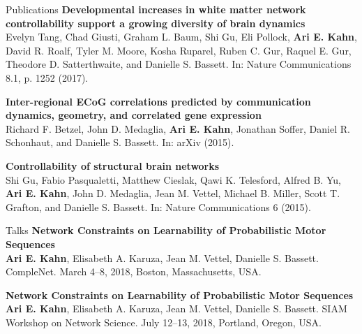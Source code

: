 \documentclass{resume} %
\begin{document}
\begin{rSection}{Publications}
\textbf{Developmental increases in white matter network controllability support a growing diversity of brain dynamics} \\
Evelyn Tang, Chad Giusti, Graham L. Baum, Shi Gu, Eli Pollock, \textbf{Ari E. Kahn}, David R. Roalf, Tyler M. Moore, Kosha Ruparel, Ruben C. Gur, Raquel E. Gur, Theodore D. Satterthwaite, and Danielle S. Bassett. In: Nature Communications 8.1, p. 1252 (2017).



\textbf{Inter-regional ECoG correlations predicted by communication dynamics, geometry, and correlated gene expression} \\
Richard F. Betzel, John D. Medaglia, \textbf{Ari E. Kahn}, Jonathan Soffer, Daniel R. Schonhaut, and Danielle S. Bassett. In: arXiv (2015).

\textbf{Controllability of structural brain networks} \\
Shi Gu, Fabio Pasqualetti, Matthew Cieslak, Qawi K. Telesford, Alfred B. Yu, \textbf{Ari E. Kahn}, John D. Medaglia, Jean M. Vettel, Michael B. Miller, Scott T. Grafton, and Danielle S. Bassett. In: Nature Communications 6 (2015).

\end{rSection}


\begin{rSection}{Talks}
\textbf{Network Constraints on Learnability of Probabilistic Motor Sequences} \\
\textbf{Ari E. Kahn}, Elisabeth A. Karuza, Jean M. Vettel, Danielle S. Bassett. CompleNet. March 4--8, 2018, Boston, Massachusetts, USA.

\textbf{Network Constraints on Learnability of Probabilistic Motor Sequences} \\
\textbf{Ari E. Kahn}, Elisabeth A. Karuza, Jean M. Vettel, Danielle S. Bassett. SIAM Workshop on Network Science. July 12--13, 2018, Portland, Oregon, USA.
\end{rSection}
\end{document}
